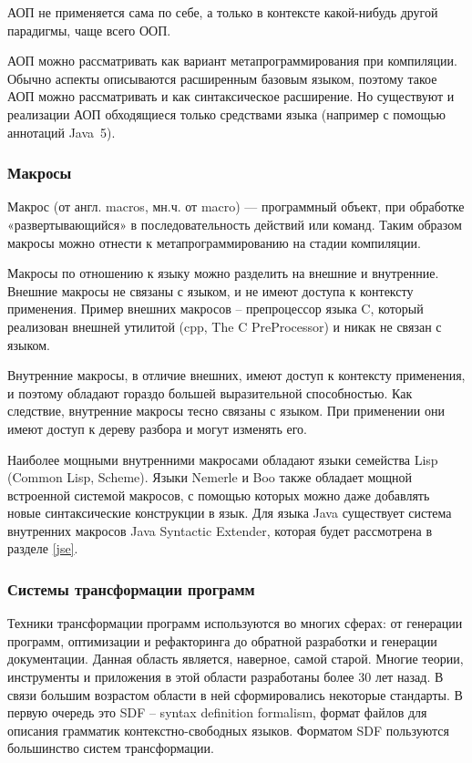 \documentclass[a4paper,12pt]{article}
\begin{document}
АОП не применяется сама по себе, а только в контексте какой-нибудь другой
парадигмы, чаще всего ООП.

АОП можно рассматривать как вариант метапрограммирования при компиляции.
Обычно аспекты описываются расширенным базовым языком, поэтому такое АОП можно
рассматривать и как синтаксическое расширение. Но существуют и реализации АОП
обходящиеся только средствами языка (например с помощью аннотаций Java~5).

\subsubsection*{Макросы}
 Макрос (от англ. macros, мн.ч. от macro) — программный объект, при обработке
«развертывающийся» в последовательность действий или команд. Таким образом
макросы можно отнести к метапрограммированию на стадии компиляции.

Макросы по отношению к языку можно разделить на внешние и внутренние.
Внешние макросы не связаны с языком, и не имеют доступа к контексту применения.
Пример внешних макросов -- препроцессор языка C, который реализован внешней
утилитой (cpp, The C PreProcessor) и никак не связан с языком.

Внутренние макросы, в отличие внешних, имеют доступ к контексту применения, и
поэтому обладают гораздо большей выразительной способностью. Как следствие,
внутренние макросы тесно связаны с языком. При применении они имеют доступ к
дереву разбора и могут изменять его.

Наиболее мощными внутренними макросами обладают языки семейства Lisp
(Common Lisp, Scheme). Языки Nemerle и Boo также обладает мощной встроенной
системой макросов, с помощью которых можно даже добавлять новые синтаксические
конструкции в язык. Для языка Java существует система внутренних макросов Java
Syntactic Extender, которая будет рассмотрена в разделе \ref{jse}.

\subsubsection*{Системы трансформации программ}
Техники трансформации программ используются во многих сферах: от генерации
программ, оптимизации и рефакторинга до обратной разработки и генерации
документации.
Данная область является, наверное, самой старой. Многие теории, инструменты и
приложения в этой области разработаны более 30 лет назад.
В связи большим возрастом области в ней сформировались некоторые стандарты.
В первую очередь это SDF \cite{sdf} -- syntax definition formalism, формат
файлов для описания грамматик контекстно-свободных языков. Форматом SDF пользуются
большинство систем трансформации.
\end{document}
